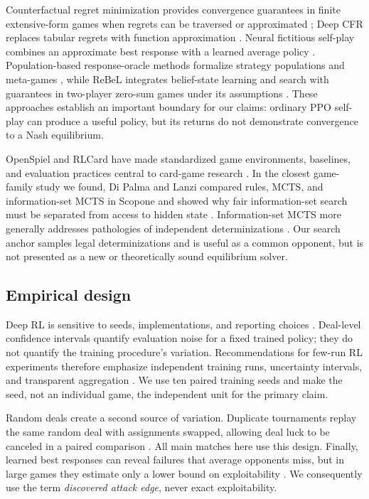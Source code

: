 \documentclass[10pt]{article}
\begin{document}
Counterfactual regret minimization provides convergence guarantees in finite extensive-form games when regrets can be traversed or approximated \cite{zinkevich2007cfr}; Deep CFR replaces tabular regrets with function approximation \cite{brown2019deepcfr}. Neural fictitious self-play combines an approximate best response with a learned average policy \cite{heinrich2016nfsp}. Population-based response-oracle methods formalize strategy populations and meta-games \cite{lanctot2017psro}, while ReBeL integrates belief-state learning and search with guarantees in two-player zero-sum games under its assumptions \cite{brown2020rebel}. These approaches establish an important boundary for our claims: ordinary PPO self-play can produce a useful policy, but its returns do not demonstrate convergence to a Nash equilibrium.

OpenSpiel and RLCard have made standardized game environments, baselines, and evaluation practices central to card-game research \cite{lanctot2019openspiel,zha2020rlcard}. In the closest game-family study we found, Di Palma and Lanzi compared rules, MCTS, and information-set MCTS in Scopone and showed why fair information-set search must be separated from access to hidden state \cite{dipalma2018scopone}. Information-set MCTS more generally addresses pathologies of independent determinizations \cite{cowling2012ismcts}. Our search anchor samples legal determinizations and is useful as a common opponent, but is not presented as a new or theoretically sound equilibrium solver.

\subsection{Empirical design}

Deep RL is sensitive to seeds, implementations, and reporting choices \cite{henderson2018matters}. Deal-level confidence intervals quantify evaluation noise for a fixed trained policy; they do not quantify the training procedure's variation. Recommendations for few-run RL experiments therefore emphasize independent training runs, uncertainty intervals, and transparent aggregation \cite{agarwal2021precipice,patterson2024empirical}. We use ten paired training seeds and make the seed, not an individual game, the independent unit for the primary claim.

Random deals create a second source of variation. Duplicate tournaments replay the same random deal with assignments swapped, allowing deal luck to be canceled in a paired comparison \cite{yu1995duplicate}. All main matches here use this design. Finally, learned best responses can reveal failures that average opponents miss, but in large games they estimate only a lower bound on exploitability \cite{timbers2022exploitability}. We consequently use the term \emph{discovered attack edge}, never exact exploitability.
\end{document}
